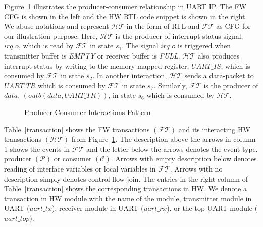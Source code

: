 \documentclass[sigconf]{acmart}
\begin{document}
Figure~\ref{fig:interleaving1} illustrates the producer-consumer relationship 
in UART IP. The FW CFG is shown in the left and the 
HW RTL code snippet is shown in the right. We abuse notations and 
represent $\mathcal{HT}$ in the form of RTL and $\mathcal{FT}$ as CFG
for our illustration purpose. Here, $\mathcal{HT}$ is the producer of interrupt 
status signal, $irq\_o$, which is read by $\mathcal{FT}$ in state $s_1$. 
The signal $irq\_o$ is  triggered when transmitter buffer is 
{\em EMPTY} or receiver buffer is {\em FULL}. 
$\mathcal{HT}$ also produces interrupt status by writing to the 
memory mapped register, $UART\_IS$, which is consumed by 
$\mathcal{FT}$ in state $s_2$.  In another interaction, $\mathcal{HT}$
sends a data-packet to $UART\_TR$ which is consumed by $\mathcal{FT}$ in state $s_7$.
Similarly, $\mathcal{FT}$ is the producer of $data$, $(outb(data,UART\_TR))$, 
in state $s_6$ which is consumed by $\mathcal{HT}$.  
%
\begin{figure}[t]
\caption{Producer Consumer Interactions Pattern
\label{fig:interleaving1}}
\end{figure}
%
Table~\ref{transaction} shows the FW transactions $(\mathcal{FT})$ and its 
interacting HW transactions $(\mathcal{HT})$ from Figure~\ref{fig:interleaving1}. 
The description above the arrows 
in column 1 shows the events in $\mathcal{FT}$ and the letter below the
arrows denotes the event type, producer $(\mathcal{P})$ or consumer 
$(\mathcal{C})$. Arrows with empty description below denotes reading of interface
variables or local variables in $\mathcal{FT}$.  Arrows with no description
simply denotes control-flow join.  The entries in the right column of
Table~\ref{transaction} shows the corresponding transactions in HW.  We 
denote a transaction in HW module with the name of the module,
transmitter module in UART ($uart\_tx$), receiver module in UART ($uart\_rx$), or
the top UART module ($uart\_top$).
%
\end{document}
